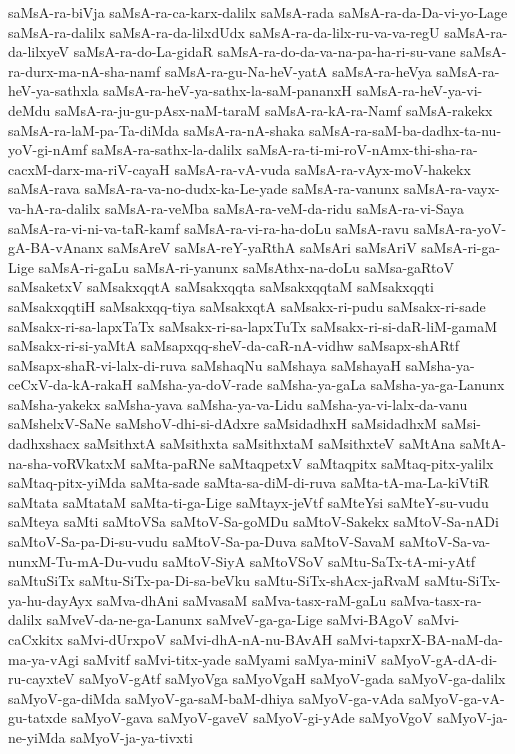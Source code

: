 {saMsA-ra-biVja
saMsA-ra-ca-karx-dalilx
saMsA-rada
saMsA-ra-da-Da-vi-yo-Lage
saMsA-ra-dalilx
saMsA-ra-da-lilxdUdx
saMsA-ra-da-lilx-ru-va-va-regU
saMsA-ra-da-lilxyeV
saMsA-ra-do-La-gidaR
saMsA-ra-do-da-va-na-pa-ha-ri-su-vane
saMsA-ra-durx-ma-nA-sha-namf
saMsA-ra-gu-Na-heV-yatA
saMsA-ra-heVya
saMsA-ra-heV-ya-sathxla
saMsA-ra-heV-ya-sathx-la-saM-pananxH
saMsA-ra-heV-ya-vi-deMdu
saMsA-ra-ju-gu-pAsx-naM-taraM
saMsA-ra-kA-ra-Namf
saMsA-rakekx
saMsA-ra-laM-pa-Ta-diMda
saMsA-ra-nA-shaka
saMsA-ra-saM-ba-dadhx-ta-nu-yoV-gi-nAmf
saMsA-ra-sathx-la-dalilx
saMsA-ra-ti-mi-roV-nAmx-thi-sha-ra-cacxM-darx-ma-riV-cayaH
saMsA-ra-vA-vuda
saMsA-ra-vAyx-moV-hakekx
saMsA-rava
saMsA-ra-va-no-dudx-ka-Le-yade
saMsA-ra-vanunx
saMsA-ra-vayx-va-hA-ra-dalilx
saMsA-ra-veMba
saMsA-ra-veM-da-ridu
saMsA-ra-vi-Saya
saMsA-ra-vi-ni-va-taR-kamf
saMsA-ra-vi-ra-ha-doLu
saMsA-ravu
saMsA-ra-yoV-gA-BA-vAnanx
saMsAreV
saMsA-reY-yaRthA
saMsAri
saMsAriV
saMsA-ri-ga-Lige
saMsA-ri-gaLu
saMsA-ri-yanunx
saMsAthx-na-doLu
saMsa-gaRtoV
saMsaketxV
saMsakxqqtA
saMsakxqqta
saMsakxqqtaM
saMsakxqqti
saMsakxqqtiH
saMsakxqq-tiya
saMsakxqtA
saMsakx-ri-pudu
saMsakx-ri-sade
saMsakx-ri-sa-lapxTaTx
saMsakx-ri-sa-lapxTuTx
saMsakx-ri-si-daR-liM-gamaM
saMsakx-ri-si-yaMtA
saMsapxqq-sheV-da-caR-nA-vidhw
saMsapx-shARtf
saMsapx-shaR-vi-lalx-di-ruva
saMshaqNu
saMshaya
saMshayaH
saMsha-ya-ceCxV-da-kA-rakaH
saMsha-ya-doV-rade
saMsha-ya-gaLa
saMsha-ya-ga-Lanunx
saMsha-yakekx
saMsha-yava
saMsha-ya-va-Lidu
saMsha-ya-vi-lalx-da-vanu
saMshelxV-SaNe
saMshoV-dhi-si-dAdxre
saMsidadhxH
saMsidadhxM
saMsi-dadhxshacx
saMsithxtA
saMsithxta
saMsithxtaM
saMsithxteV
saMtAna
saMtA-na-sha-voRVkatxM
saMta-paRNe
saMtaqpetxV
saMtaqpitx
saMtaq-pitx-yalilx
saMtaq-pitx-yiMda
saMta-sade
saMta-sa-diM-di-ruva
saMta-tA-ma-La-kiVtiR
saMtata
saMtataM
saMta-ti-ga-Lige
saMtayx-jeVtf
saMteYsi
saMteY-su-vudu
saMteya
saMti
saMtoVSa
saMtoV-Sa-goMDu
saMtoV-Sakekx
saMtoV-Sa-nADi
saMtoV-Sa-pa-Di-su-vudu
saMtoV-Sa-pa-Duva
saMtoV-SavaM
saMtoV-Sa-va-nunxM-Tu-mA-Du-vudu
saMtoV-SiyA
saMtoVSoV
saMtu-SaTx-tA-mi-yAtf
saMtuSiTx
saMtu-SiTx-pa-Di-sa-beVku
saMtu-SiTx-shAcx-jaRvaM
saMtu-SiTx-ya-hu-dayAyx
saMva-dhAni
saMvasaM
saMva-tasx-raM-gaLu
saMva-tasx-ra-dalilx
saMveV-da-ne-ga-Lanunx
saMveV-ga-ga-Lige
saMvi-BAgoV
saMvi-caCxkitx
saMvi-dUrxpoV
saMvi-dhA-nA-nu-BAvAH
saMvi-tapxrX-BA-naM-da-ma-ya-vAgi
saMvitf
saMvi-titx-yade
saMyami
saMya-miniV
saMyoV-gA-dA-di-ru-cayxteV
saMyoV-gAtf
saMyoVga
saMyoVgaH
saMyoV-gada
saMyoV-ga-dalilx
saMyoV-ga-diMda
saMyoV-ga-saM-baM-dhiya
saMyoV-ga-vAda
saMyoV-ga-vA-gu-tatxde
saMyoV-gava
saMyoV-gaveV
saMyoV-gi-yAde
saMyoVgoV
saMyoV-ja-ne-yiMda
saMyoV-ja-ya-tivxti
}
